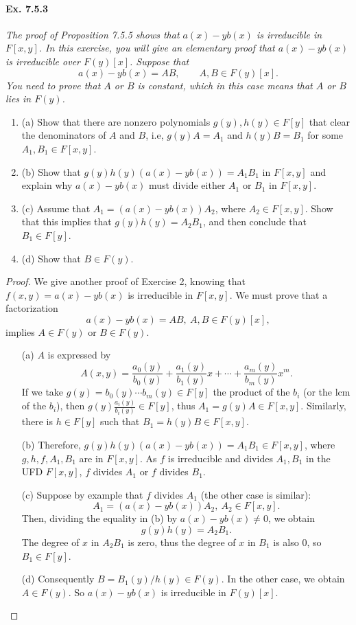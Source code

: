 \documentclass[11pt,a4paper]{article}
\newcommand{\be} {\begin{enumerate}}
\newcommand{\ee} {\end{enumerate}}
\begin{document}
\paragraph{Ex. 7.5.3}

{\it The proof of Proposition 7.5.5 shows that $a(x) - yb(x)$ is irreducible in $F[x,y]$. In this exercise, you will give an elementary proof that $a(x) - yb(x)$ is irreducible over $F(y)[x]$.
Suppose that
$$a(x) - yb(x) = AB,\qquad A,B \in F(y)[x].$$
You need to prove that $A$ or $B$ is constant, which in this case means that $A$ or $B$ lies in $F(y)$.
\be
\item[(a)] Show that there are nonzero polynomials $g(y),h(y)\in F[y]$ that clear the denominators of $A$ and $B$, i.e, $g(y)A = A_1$ and $h(y)B = B_1$ for some $A_1,B_1 \in F[x,y]$.
\item[(b)] Show that $g(y)h(y)(a(x) - yb(x)) = A_1B_1$ in $F[x,y]$ and explain why $a(x) -yb(x)$ must divide either $A_1$ or $B_1$ in $F[x,y]$.
\item[(c)] Assume that $A_1 = (a(x) -yb(x))A_2$, where $A_2 \in F[x,y]$. Show that this implies that $g(y)h(y) = A_2B_1$, and then conclude that $B_1\in F[y]$.
\item[(d)] Show that $B\in F(y)$.
\ee
}

\begin{proof}
We give another proof of Exercise 2, knowing that $f(x,y)=a(x) - yb(x)$ is irreducible in $F[x,y]$. We must prove that a factorization 
$$a(x)-yb(x) = AB,\ A,B \in F(y)[x],$$
implies $A \in F(y)$ or $B \in F(y)$.
\begin{enumerate}
\item[(a)]
$A$ is expressed by
$$A(x,y) = \frac{a_0(y)}{b_0(y)} +  \frac{a_1(y)}{b_1(y)} x + \cdots+  \frac{a_m(y)}{b_m(y)} x^m.$$
If we take $g(y) = b_0(y)\cdots b_m(y) \in F[y]$ the product of the $b_i$ (or the lcm of the $b_i$), then $g(y)  \frac{a_i(y)}{b_i(y)} \in F[y]$, thus $A_1 = g(y)A \in F[x,y]$. Similarly, there is  $h \in F[y]$ such that $B_1 = h(y)B \in F[x,y]$.

\item[(b)]
Therefore, $g(y) h(y)(a(x) - y b(x)) = A_1 B_1 \in F[x,y]$, where $g,h,f,A_1,B_1$ are in $F[x,y]$.
As $f$ is irreducible and divides $A_1,B_1$ in the UFD $F[x,y]$, $f$ divides $A_1$ or $f$ divides $B_1$.

\item[(c)] Suppose by example that $f$ divides $A_1$ (the other case is similar):
$$A_1 = (a(x) - yb(x)) A_2, \ A_2 \in F[x,y].$$
Then, dividing the equality in (b) by $a(x) - y b(x) \neq 0$, we obtain
$$g(y)h(y) = A_2 B_1.$$
The degree of $x$ in $A_2 B_1$ is zero, thus the degree of $x$ in $B_1$ is also 0, so $B_1 \in F[y]$.

\item[(d)]  
Consequently $B =B_1(y)/h(y) \in F(y)$.
In the other case, we obtain $A \in F(y)$. So $a(x) - yb(x) $ is irreducible in $F(y)[x]$.
\end{enumerate}
\end{proof}
\end{document}
